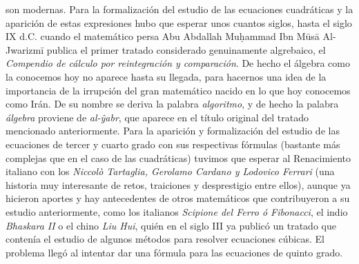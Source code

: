 \documentclass[12pt]{article}
\begin{document}
son modernas. Para la formalización del estudio de las ecuaciones cuadráticas y la aparición de estas expresiones hubo que esperar unos cuantos siglos, hasta el siglo IX d.C. cuando el matemático persa Abu Abdallah Muḥammad Ibn Mūsā Al-Jwarizmī publica el primer tratado considerado genuinamente algrebaico, el \textit{Compendio de cálculo por reintegración y comparación}. De hecho el álgebra como la conocemos hoy no aparece hasta su llegada, para hacernos una idea de la importancia de la irrupción del gran matemático nacido en lo que hoy conocemos como Irán. De su nombre se deriva la palabra \textit{algoritmo}, y de hecho la palabra \textit{álgebra} proviene de \textit{al-ŷabr}, que aparece en el título original del tratado mencionado anteriormente. Para la aparición y formalización del estudio de las ecuaciones de tercer y cuarto grado con sus respectivas fórmulas (bastante más complejas que en el caso de las cuadráticas) tuvimos que esperar al Renacimiento italiano con los \textit{Niccolò Tartaglia, Gerolamo Cardano y Lodovico Ferrari} (una historia muy interesante de retos, traiciones y desprestigio entre ellos), aunque ya hicieron aportes y hay antecedentes de otros matemáticos que contribuyeron a su estudio anteriormente, como los italianos \textit{Scipione del Ferro ó Fibonacci}, el indio \textit{Bhaskara II} o el chino \textit{Liu Hui}, quién en el siglo III ya publicó un tratado que contenía el estudio de algunos métodos para resolver ecuaciones cúbicas. El problema llegó al intentar dar una fórmula para las ecuaciones de quinto grado. 
\end{document}
